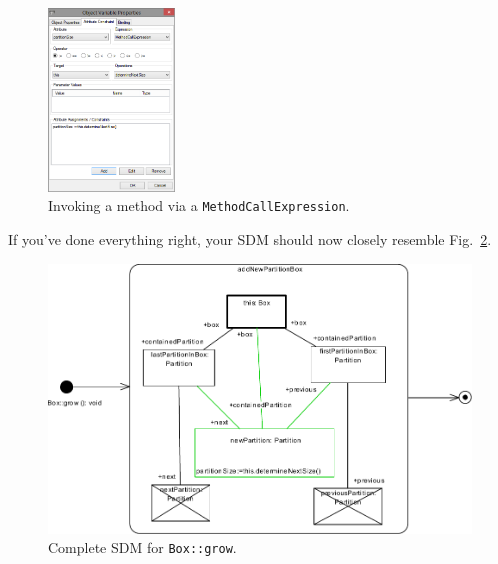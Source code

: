 \begin{figure}[htbp]
\begin{center}
  \includegraphics[width=0.3\textwidth]{pics/sdmBilder/grow/sdm66.png}
  \caption{Invoking a method via a \texttt{MethodCallExpression}.}  
  \label{fig:sdm_grow_4} 
\end{center}
\end{figure}
\FloatBarrier

If you've done everything right, your SDM should now closely resemble
Fig.~\ref{fig:sdm_grow_5}.  

\begin{figure}[htbp]
\begin{center}
  \includegraphics[width=\textwidth]{pics/sdmBilder/grow/sdm67}
  \caption{Complete SDM for \texttt{Box::grow}.}  
  \label{fig:sdm_grow_5}
\end{center}
\end{figure}
